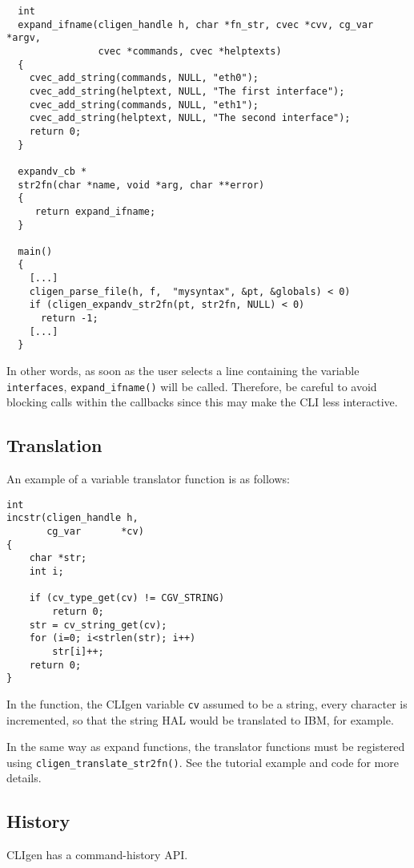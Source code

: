 \documentclass[a4paper, 10pt] {article}
\begin{document}
\begin{verbatim}
  int 
  expand_ifname(cligen_handle h, char *fn_str, cvec *cvv, cg_var *argv, 
                cvec *commands, cvec *helptexts)
  {
    cvec_add_string(commands, NULL, "eth0");
    cvec_add_string(helptext, NULL, "The first interface");
    cvec_add_string(commands, NULL, "eth1");
    cvec_add_string(helptext, NULL, "The second interface");
    return 0;
  }

  expandv_cb *
  str2fn(char *name, void *arg, char **error)
  {
     return expand_ifname;
  }

  main()
  {   
    [...]
    cligen_parse_file(h, f,  "mysyntax", &pt, &globals) < 0)
    if (cligen_expandv_str2fn(pt, str2fn, NULL) < 0)
      return -1;
    [...]
  }
\end{verbatim}

In other words, as soon as the user selects a line containing the
variable {\tt interfaces}, {\tt expand\_ifname()} will be
called. Therefore, be careful to avoid blocking calls within the
callbacks since this may make the CLI less interactive.

\subsection{Translation}
\label{sec:translate}

An example of a variable translator function is as follows:
\begin{verbatim}
int
incstr(cligen_handle h,
       cg_var       *cv)
{
    char *str;
    int i;
    
    if (cv_type_get(cv) != CGV_STRING)
        return 0;
    str = cv_string_get(cv);
    for (i=0; i<strlen(str); i++)
        str[i]++;
    return 0;
}
\end{verbatim}

In the function, the CLIgen variable {\tt cv} assumed to be a string, every character is incremented, so that the string HAL would be translated to IBM, for example.

In the same way as expand functions, the translator functions must be registered using {\tt cligen\_translate\_str2fn()}. See the tutorial example and code for more details.

\subsection{History}

CLIgen has a command-history API.
\end{document}
